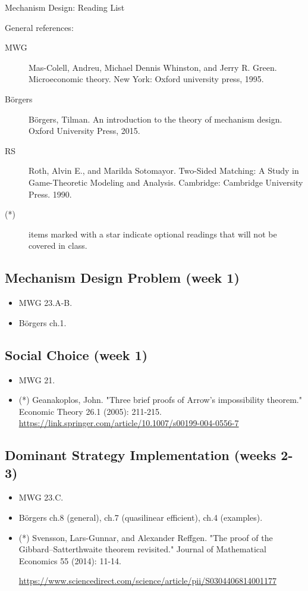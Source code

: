 \documentclass{article}
\begin{document}
\begin{center}
	{\huge Mechanism Design: Reading List}
\end{center}
\bigskip

General references:
\begin{description}
	\item[MWG] Mas-Colell, Andreu, Michael Dennis Whinston, and Jerry R. Green. Microeconomic theory. New York: Oxford university press, 1995. 
	\item[B\"{o}rgers] B\"{o}rgers, Tilman. An introduction to the theory of mechanism design. Oxford University Press, 2015.
	\item[RS] Roth, Alvin E., and Marilda Sotomayor. Two-Sided Matching: A Study in Game-Theoretic Modeling and Analysis. Cambridge: Cambridge University Press. 1990.
	\item[(*)] items marked with a star indicate optional readings that will not be covered in class.
\end{description}
\medskip

\subsection{Mechanism Design Problem (week 1)}
\begin{itemize}
	\item MWG 23.A-B.
	\item B{\"o}rgers ch.1.
\end{itemize}

\subsection{Social Choice (week 1)}
\begin{itemize}
	\item MWG 21.
	\item (*) Geanakoplos, John. "Three brief proofs of Arrow’s impossibility theorem." Economic Theory 26.1 (2005): 211-215. \url{https://link.springer.com/article/10.1007/s00199-004-0556-7}
\end{itemize}

\subsection{Dominant Strategy Implementation (weeks 2-3)}
\begin{itemize}
	\item MWG 23.C.
	\item B{\"o}rgers ch.8 (general), ch.7 (quasilinear efficient), ch.4 (examples).
	\item (*) Svensson, Lars-Gunnar, and Alexander Reffgen. "The proof of the Gibbard–Satterthwaite theorem revisited." Journal of Mathematical Economics 55 (2014): 11-14.
	
	\url{https://www.sciencedirect.com/science/article/pii/S0304406814001177}
\end{itemize}
\end{document}
